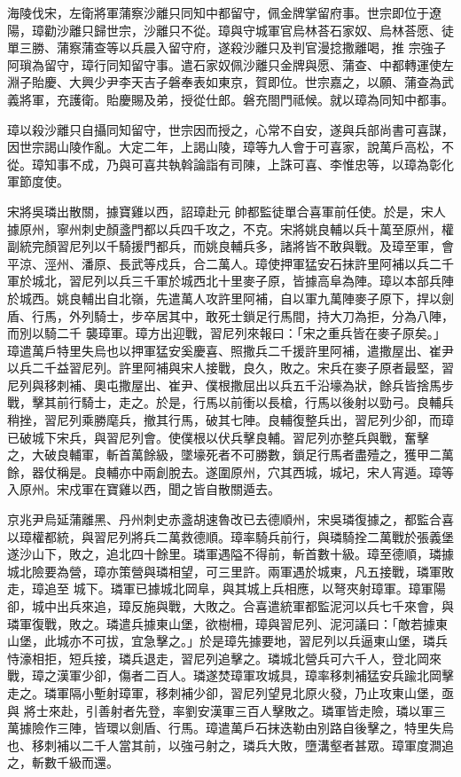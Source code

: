 \begin{pinyinscope}
 海陵伐宋，左衛將軍蒲察沙離只同知中都留守，佩金牌掌留府事。世宗即位于遼陽，璋勸沙離只歸世宗，沙離只不從。璋與守城軍官烏林荅石家奴、烏林荅愿、徒單三勝、蒲察蒲查等以兵晨入留守府，遂殺沙離只及判官漫捻撒離喝，推
 宗強子阿瑣為留守，璋行同知留守事。遣石家奴佩沙離只金牌與愿、蒲查、中都轉運使左淵子貽慶、大興少尹李天吉子磐奉表如東京，賀即位。世宗嘉之，以願、蒲查為武義將軍，充護衛。貽慶賜及弟，授從仕郎。磐充閤門祗候。就以璋為同知中都事。



 璋以殺沙離只自攝同知留守，世宗因而授之，心常不自安，遂與兵部尚書可喜謀，因世宗謁山陵作亂。大定二年，上謁山陵，璋等九人會于可喜家，說萬戶高松，不從。璋知事不成，乃與可喜共執斡論詣有司陳，上誅可喜、李惟忠等，以璋為彰化軍節度使。



 宋將吳璘出散關，據寶雞以西，詔璋赴元
 帥都監徒單合喜軍前任使。於是，宋人據原州，寧州刺史顏盞門都以兵四千攻之，不克。宋將姚良輔以兵十萬至原州，權副統完顏習尼列以千騎援門都兵，而姚良輔兵多，諸將皆不敢與戰。及璋至軍，會平涼、涇州、潘原、長武等戍兵，合二萬人。璋使押軍猛安石抹許里阿補以兵二千軍於城北，習尼列以兵三千軍於城西北十里麥子原，皆據高阜為陣。璋以本部兵陣於城西。姚良輔出自北嶺，先遣萬人攻許里阿補，自以軍九萬陣麥子原下，捍以劍盾、行馬，外列騎士，步卒居其中，敢死士鎖足行馬間，持大刀為拒，分為八陣，而別以騎二千
 襲璋軍。璋方出迎戰，習尼列來報曰：「宋之重兵皆在麥子原矣。」璋遣萬戶特里失烏也以押軍猛安奚慶喜、照撒兵二千援許里阿補，遣撒屋出、崔尹以兵二千益習尼列。許里阿補與宋人接戰，良久，敗之。宋兵在麥子原者最堅，習尼列與移刺補、奧屯撒屋出、崔尹、僕根撒屈出以兵五千沿壕為狀，餘兵皆捨馬步戰，擊其前行騎士，走之。於是，行馬以前衝以長槍，行馬以後射以勁弓。良輔兵稍挫，習尼列乘勝麾兵，撤其行馬，破其七陣。良輔復整兵出，習尼列少卻，而璋已破城下宋兵，與習尼列會。使僕根以伏兵擊良輔。習尼列亦整兵與戰，奮擊
 之，大破良輔軍，斬首萬餘級，墜壕死者不可勝數，鎖足行馬者盡殪之，獲甲二萬餘，器仗稱是。良輔亦中兩創脫去。遂圍原州，穴其西城，城圮，宋人宵遁。璋等入原州。宋戍軍在寶雞以西，聞之皆自散關遁去。



 京兆尹烏延蒲離黑、丹州刺史赤盞胡速魯改已去德順州，宋吳璘復據之，都監合喜以璋權都統，與習尼列將兵二萬救德順。璋率騎兵前行，與璘騎拴二萬戰於張義堡遂沙山下，敗之，追北四十餘里。璘軍遇隘不得前，斬首數十級。璋至德順，璘據城北險要為營，璋亦策營與璘相望，可三里許。兩軍遇於城東，凡五接戰，璘軍敗走，璋追至
 城下。璘軍已據城北岡阜，與其城上兵相應，以弩夾射璋軍。璋軍陽卻，城中出兵來追，璋反施與戰，大敗之。合喜遣統軍都監泥河以兵七千來會，與璘軍復戰，敗之。璘遣兵據東山堡，欲樹柵，璋與習尼列、泥河議曰：「敵若據東山堡，此城亦不可拔，宜急擊之。」於是璋先據要地，習尼列以兵逼東山堡，璘兵恃濠相拒，短兵接，璘兵退走，習尼列追擊之。璘城北營兵可六千人，登北岡來戰，璋之漢軍少卻，傷者二百人。璘遂焚璋軍攻城具，璋率移刺補猛安兵踰北岡擊走之。璘軍隔小塹射璋軍，移刺補少卻，習尼列望見北原火發，乃止攻東山堡，亟與
 將士來赴，引善射者先登，率劉安漢軍三百人擊敗之。璘軍皆走險，璘以軍三萬據險作三陣，皆環以劍盾、行馬。璋遣萬戶石抹迭勒由別路自後擊之，特里失烏也、移刺補以二千人當其前，以強弓射之，璘兵大敗，墮溝壑者甚眾。璋軍度澗追之，斬數千級而還。




\end{pinyinscope}
